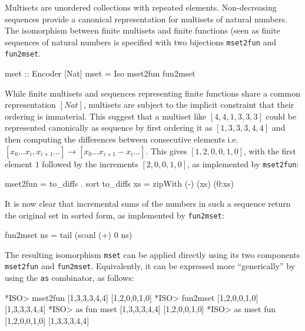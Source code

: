 \documentclass[]{INCLUDES/llncs}
\begin{document}
Multisets \cite{multisetOver} are unordered collections with repeated
elements. 
Non-decreasing sequences provide a canonical representation for
multisets of natural numbers. 
The isomorphism between finite multisets and finite functions (seen as
finite sequences of natural numbers is
specified with two bijections {\tt mset2fun} and {\tt fun2mset}.
\begin{code}
mset :: Encoder [Nat]
mset = Iso mset2fun fun2mset
\end{code}
While finite multisets and sequences representing finite functions share a
common representation $[Nat]$, multisets are subject to the implicit constraint that their
ordering is immaterial.
This suggest that a multiset like $[4,4,1,3,3,3]$ could be
represented canonically as sequence by first ordering it as $[1,3,3,3,4,4]$ and
then computing the differences between consecutive elements i.e.
$[x_0 \ldots x_i, x_{i+1} \ldots] \rightarrow [x_0 \ldots x_{i+1}-x_i
\ldots]$.
This gives $[1,2,0,0,1,0]$, with
the first element $1$ followed by the increments $[2,0,0,1,0]$,
as implemented by {\tt mset2fun}:
\begin{code}
mset2fun = to_diffs . sort
to_diffs xs = zipWith (-) (xs) (0:xs)
\end{code}
It is now clear that incremental sums of the
numbers in such a sequence
return the original set
in sorted form, as implemented by {\tt fun2mset}:
\begin{code}
fun2mset ns = tail (scanl (+) 0 ns) 
\end{code}
The resulting isomorphism {\tt mset} can be applied directly using its two
components {\tt mset2fun} and {\tt fun2mset}. Equivalently, it can be
expressed more ``generically'' by using the {\tt as} combinator, as
follows:
\begin{codex}
*ISO> mset2fun [1,3,3,3,4,4]
[1,2,0,0,1,0]
*ISO> fun2mset [1,2,0,0,1,0]
[1,3,3,3,4,4]
*ISO> as fun mset [1,3,3,3,4,4]
[1,2,0,0,1,0]
*ISO> as mset fun [1,2,0,0,1,0]
[1,3,3,3,4,4]
\end{codex}
\end{document}
